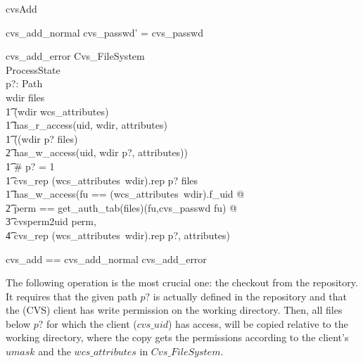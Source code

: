 \begin{doc}{cvsAdd}
\begin{schema}{cvs\_add\_normal}
    cvs\_passwd' = cvs\_passwd \\
  \end{schema}
  \begin{schema}{cvs\_add\_error}
    \Xi Cvs\_FileSystem\\
    \Xi ProcessState \\
    p?: Path \\ 
    \where
    \lnot wdir \isdirin files \\
    \t1 \lor \lnot(wdir \in \dom wcs\_attributes) \\
    \t1 \lor \lnot has\_r\_access(uid, wdir, attributes) \\
    \t1 \lor \lnot ((wdir \cat p? \isdirin files) \implies \\
    \t2 has\_w\_access(uid, wdir \cat p?, attributes)) \\
    \t1 \lor \lnot \# p? = 1 \\
    \t1 \lor \lnot cvs\_rep \cat (wcs\_attributes~wdir).rep \cat p? \notin \dom
    files \\ 
    \t1 \lor \lnot has\_w\_access(\LET fu == (wcs\_attributes~wdir).f\_uid @ \\
    \t2 \LET perm == get\_auth\_tab(files)(fu,cvs\_passwd fu) @ \\
    \t3 cvsperm2uid perm, \\
    \t4 cvs\_rep \cat (wcs\_attributes~wdir).rep \cat p?, attributes) \\
  \end{schema}
  \begin{zed}
    cvs\_add == cvs\_add\_normal \lor cvs\_add\_error \\
  \end{zed}
\end{doc}


The following operation is the most crucial one: the checkout from the
repository. It requires that the given path $p?$ is actually defined in the
repository and that the (CVS) client has write permission on the working
directory.  Then, all files below $p?$ for which the client ($cvs\_uid$) has
access, will be copied relative to the working directory, where the copy gets
the \unix{} permissions according to the client's $umask$ and the
$wcs\_attributes$ in $Cvs\_FileSystem$.

